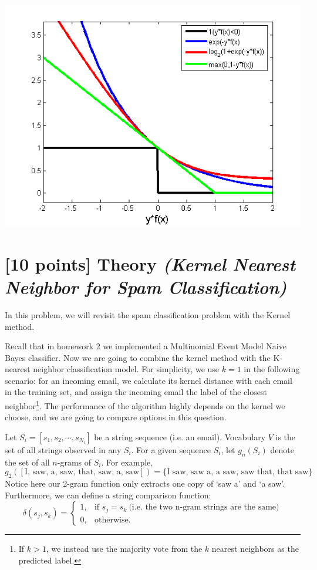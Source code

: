 \documentclass{article}
\begin{document}
\begin{enumerate}
{\includegraphics{loss_functions_q2_5.png}
}

\end{enumerate}

\clearpage

\section{[10 points] Theory \it{(Kernel Nearest Neighbor for Spam Classification)}}

In this problem, we will revisit the spam classification problem with the Kernel method. 

Recall that in homework 2 we implemented a Multinomial Event Model Naive Bayes classifier. Now we are going to combine the kernel method with the  K-nearest neighbor classification model. For simplicity, we use $k=1$ in the following scenario: for an incoming email, we calculate its kernel distance with each email in the training set, and assign the incoming email the label of the closest neighbor\footnote{If $k > 1$, we instead use the majority vote from the $k$ nearest neighbors as the predicted label.}. The performance of the algorithm highly depends on the kernel we choose, and we are going to compare options in this question.  

Let $S_i = [s_1, s_2, \cdots, s_{N_i}]$ be a string sequence (i.e. an email). Vocabulary $V$ is the set of all strings observed in any $S_i$. For a given sequence $S_i$, let $g_n(S_i)$ denote the set of all $n$-grams of $S_i$. For example,
    $$
        g_2([\text{I, saw, a, saw, that, saw, a, saw} ]) = \{\text{I saw},\,\text{saw a},\,\text{a saw},\,\text{saw that},\,\text{that saw}\}
    $$
    Notice here our 2-gram function only extracts one copy of `saw a' and `a saw'. Furthermore, we can define a string comparison function: 
\[
    \delta(s_j, s_k) =
\begin{cases}
  1,& \text{if } s_j = s_k\ \text{(i.e. the two n-gram strings are the same)}\\
    0,& \text{otherwise.}
\end{cases}
\]
\end{document}
